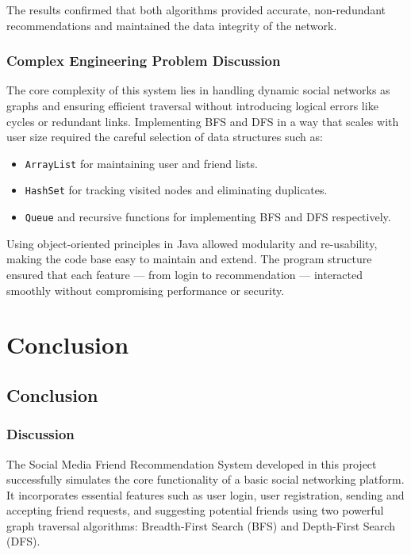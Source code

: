\documentclass[12pt]{report}
\begin{document}
The results confirmed that both algorithms provided accurate, non-redundant recommendations and maintained the data integrity of the network.

\subsection{Complex Engineering Problem Discussion}

The core complexity of this system lies in handling dynamic social networks as graphs and ensuring efficient traversal without introducing logical errors like cycles or redundant links. Implementing BFS and DFS in a way that scales with user size required the careful selection of data structures such as:

\begin{itemize}
    \item \texttt{ArrayList} for maintaining user and friend lists.
    \item \texttt{HashSet} for tracking visited nodes and eliminating duplicates.
    \item \texttt{Queue} and recursive functions for implementing BFS and DFS respectively.
\end{itemize}

Using object-oriented principles in Java allowed modularity and re-usability, making the code base easy to maintain and extend. The program structure ensured that each feature — from login to recommendation — interacted smoothly without compromising performance or security.





\newpage
\chapter{Conclusion}
\section{Conclusion}

\subsection{Discussion}
The Social Media Friend Recommendation System developed in this project successfully simulates the core functionality of a basic social networking platform. It incorporates essential features such as user login, user registration, sending and accepting friend requests, and suggesting potential friends using two powerful graph traversal algorithms: Breadth-First Search (BFS) and Depth-First Search (DFS). 
\end{document}

